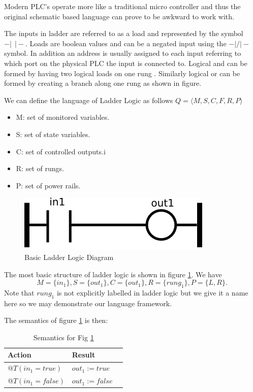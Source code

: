 Modern PLC's operate more like a traditional micro controller and thus the 
original schematic based language can prove to be awkward to work with.

The inputs in ladder are referred to as a load and represented by the 
symbol $-\vert ~ ~ \vert-$. %
Loads are boolean values and can be a negated input using the $-\vert/\vert-$ symbol. 
In addition an address is usually assigned to each input referring to 
which port on the physical PLC the input is connected to. Logical and 
can be formed by having two logical loads on one rung \cite{ebookmorris}. 
Similarly logical or can be formed by creating a branch along one 
rung as shown in figure. %

We can define the language of Ladder Logic as follows $Q = \langle M,S,C,F,R,P \rangle $

\begin{itemize}
	\item M: set of monitored variables.
	\item S: set of state variables.
	\item C: set of controlled outputs.i
	\item R: set of rungs.
	\item P: set of power rails.
\end{itemize}

\begin{figure}[htp]
    \centering
    \includegraphics[width=\imgsmall]{./images/intro_fig1.png}
    \caption{Basic Ladder Logic Diagram}
    \label{fig:intro_fig1}
\end{figure}

The most basic structure of ladder logic is shown in figure \ref{fig:intro_fig1}. 
We have 
$$M=\lbrace in_1 \rbrace, S=\lbrace out_1 \rbrace, C=\lbrace out_1 \rbrace, R=\lbrace rung_1 \rbrace, P=\lbrace L,R \rbrace.$$
Note that $rung_1$ is not explicitly labelled in ladder logic but we give it a name here
so we may demonstrate our language framework.

The semantics of figure \ref{fig:intro_fig1} is then: 
\begin{table}[htp]
    \centering
    \begin{tabular}{|l|l|l|}
        \hline
        Action & Result \\
        \hline
        $@T(in_1 = true)$ & $out_1 := true$ \\
        \hline
        $@T(in_1 = false)$ & $out_1 := false$ \\
        \hline
    \end{tabular}
    \caption{Semantics for Fig \ref{fig:intro_fig1}}
    \label{table:table_for_fig1}
\end{table}


